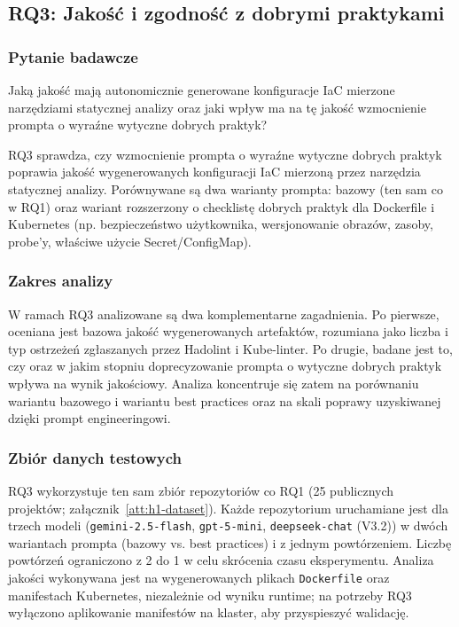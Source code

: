 \subsection{RQ3: Jakość i zgodność z dobrymi praktykami}

\subsubsection{Pytanie badawcze}

Jaką jakość mają autonomicznie generowane konfiguracje IaC mierzone narzędziami statycznej analizy oraz jaki wpływ ma na tę jakość wzmocnienie prompta o wyraźne wytyczne dobrych praktyk?

RQ3 sprawdza, czy wzmocnienie prompta o wyraźne wytyczne dobrych praktyk poprawia jakość wygenerowanych konfiguracji IaC mierzoną przez narzędzia statycznej analizy. Porównywane są dwa warianty prompta: bazowy (ten sam co w RQ1) oraz wariant rozszerzony o checklistę dobrych praktyk dla Dockerfile i Kubernetes (np. bezpieczeństwo użytkownika, wersjonowanie obrazów, zasoby, probe'y, właściwe użycie Secret/ConfigMap).

\subsubsection{Zakres analizy}

W ramach RQ3 analizowane są dwa komplementarne zagadnienia. Po pierwsze, oceniana jest bazowa jakość wygenerowanych artefaktów, rozumiana jako liczba i typ ostrzeżeń zgłaszanych przez Hadolint i Kube-linter. Po drugie, badane jest to, czy oraz w jakim stopniu doprecyzowanie prompta o wytyczne dobrych praktyk wpływa na wynik jakościowy. Analiza koncentruje się zatem na porównaniu wariantu bazowego i wariantu best practices oraz na skali poprawy uzyskiwanej dzięki prompt engineeringowi.

\subsubsection{Zbiór danych testowych}

RQ3 wykorzystuje ten sam zbiór repozytoriów co RQ1 (25 publicznych projektów; załącznik~\ref{att:h1-dataset}). Każde repozytorium uruchamiane jest dla trzech modeli (\texttt{gemini-2.5-flash}, \texttt{gpt-5-mini}, \texttt{deepseek-chat} (V3.2)) w dwóch wariantach prompta (bazowy vs. best practices) i z jednym powtórzeniem. Liczbę powtórzeń ograniczono z 2 do 1 w celu skrócenia czasu eksperymentu. Analiza jakości wykonywana jest na wygenerowanych plikach \texttt{Dockerfile} oraz manifestach Kubernetes, niezależnie od wyniku runtime; na potrzeby RQ3 wyłączono aplikowanie manifestów na klaster, aby przyspieszyć walidację.

